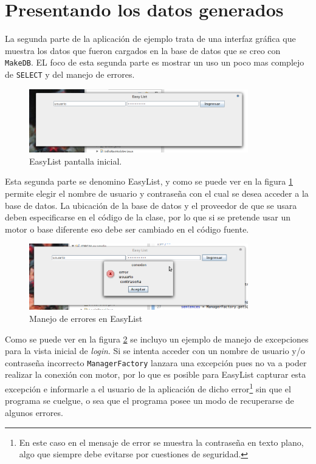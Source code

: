 \section{Presentando los datos generados}
La segunda parte de la aplicación de ejemplo trata de una interfaz gráfica que muestra los datos que fueron cargados en la base de datos que se creo con \verb=MakeDB=. EL foco de esta segunda parte es mostrar un uso un poco mas complejo de \verb=SELECT= y del manejo de errores.
%

\begin{figure}[h]
  \centering
    \includegraphics[width=0.85\textwidth]{figuras/ejemplo-a.png}
  \caption{EasyList pantalla inicial.}
  \label{fig:easylist-inicio}
\end{figure}

Esta segunda parte se denomino EasyList, y como se puede ver en la figura \ref{fig:easylist-inicio} permite elegir el nombre de usuario y contraseña con el cual se desea acceder a la base de datos. La ubicación de la base de datos y el proveedor de \dd que se usara deben especificarse en el código de la clase, por lo que si se pretende usar un motor o base diferente eso debe ser cambiado en el código fuente.
%

\begin{figure}[h]
  \centering
    \includegraphics[width=0.85\textwidth]{figuras/ejemplo-b.png}
  \caption{Manejo de errores en EasyList}
  \label{fig:easylist-error}
\end{figure}
%

Como se puede ver en la figura \ref{fig:easylist-error} se incluyo un ejemplo de manejo de excepciones para la vista inicial de \textit{login}. Si se intenta acceder con un nombre de usuario y/o contraseña incorrecto \verb=ManagerFactory= lanzara una excepción pues no va a poder realizar la conexión con motor, por lo que es posible para EasyList capturar esta excepción e informarle a el usuario de la aplicación de dicho error\footnote{En este caso en el mensaje de error se muestra la contraseña en texto plano, algo que siempre debe evitarse por cuestiones de seguridad.} sin que el programa se cuelgue, o sea que el programa posee un modo de recuperarse de algunos errores.

